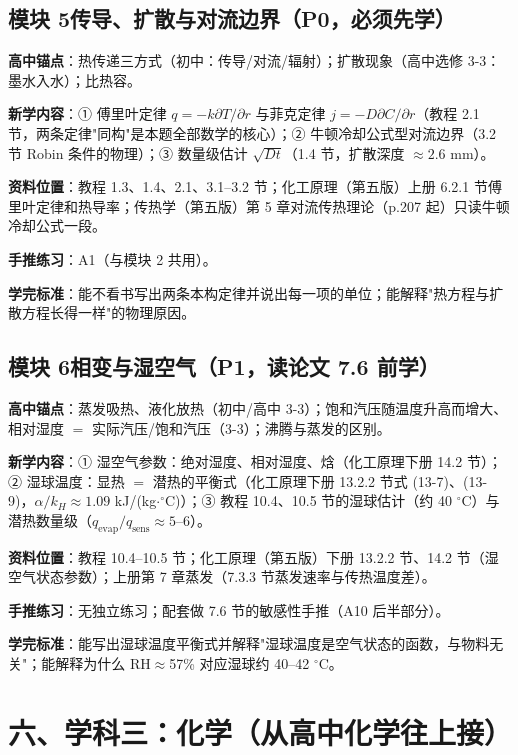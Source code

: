 \documentclass[12pt,a4paper]{ctexart}
\begin{document}
\subsection{模块 5\quad 传导、扩散与对流边界（P0，必须先学）}

\textbf{高中锚点}：热传递三方式（初中：传导/对流/辐射）；扩散现象（高中选修 3-3：墨水入水）；比热容。

\textbf{新学内容}：① 傅里叶定律 $q=-k\partial T/\partial r$ 与菲克定律 $j=-D\partial C/\partial r$（教程 2.1 节，两条定律"同构"是本题全部数学的核心）；② 牛顿冷却公式型对流边界（3.2 节 Robin 条件的物理）；③ 数量级估计 $\sqrt{Dt}$（1.4 节，扩散深度 $\approx2.6$ mm）。

\textbf{资料位置}：教程 1.3、1.4、2.1、3.1--3.2 节；化工原理（第五版）上册 6.2.1 节傅里叶定律和热导率；传热学（第五版）第 5 章对流传热理论（p.207 起）只读牛顿冷却公式一段。

\textbf{手推练习}：A1（与模块 2 共用）。

\textbf{学完标准}：能不看书写出两条本构定律并说出每一项的单位；能解释"热方程与扩散方程长得一样"的物理原因。

\subsection{模块 6\quad 相变与湿空气（P1，读论文 7.6 前学）}

\textbf{高中锚点}：蒸发吸热、液化放热（初中/高中 3-3）；饱和汽压随温度升高而增大、相对湿度 $=$ 实际汽压/饱和汽压（3-3）；沸腾与蒸发的区别。

\textbf{新学内容}：① 湿空气参数：绝对湿度、相对湿度、焓（化工原理下册 14.2 节）；② 湿球温度：显热 $=$ 潜热的平衡式（化工原理下册 13.2.2 节式 (13-7)、(13-9)，$\alpha/k_H\approx1.09$ kJ/(kg$\cdot$$^\circ$C)）；③ 教程 10.4、10.5 节的湿球估计（约 40 $^\circ$C）与潜热数量级（$q_{\text{evap}}/q_{\text{sens}}\approx5$--$6$）。

\textbf{资料位置}：教程 10.4--10.5 节；化工原理（第五版）下册 13.2.2 节、14.2 节（湿空气状态参数）；上册第 7 章蒸发（7.3.3 节蒸发速率与传热温度差）。

\textbf{手推练习}：无独立练习；配套做 7.6 节的敏感性手推（A10 后半部分）。

\textbf{学完标准}：能写出湿球温度平衡式并解释"湿球温度是空气状态的函数，与物料无关"；能解释为什么 RH$\approx$57\% 对应湿球约 40--42 $^\circ$C。

\section{六、学科三：化学（从高中化学往上接）}
\end{document}
